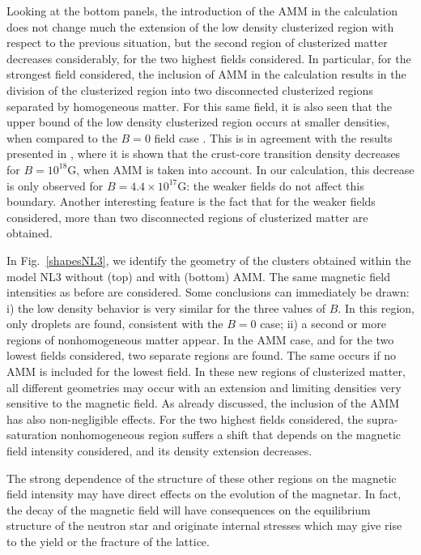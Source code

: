 \documentclass[epj]{svjour}
\begin{document}
Looking at the bottom panels, the introduction of the AMM in the calculation does
not change much the extension of the low density clusterized region with respect to the previous
situation, but the second region of clusterized matter decreases considerably, for the two highest fields considered. In particular, for the strongest field
considered, the inclusion of AMM in the calculation results in
  the division of the clusterized region into two disconnected
  clusterized regions separated by homogeneous matter.
For this same field, it is also seen that
the upper bound of the low density clusterized region occurs at smaller
densities, when compared to the $B=0$ field case \cite{Avancini-10}.
This is in agreement with the results presented in
\cite{Bao21}, where it is shown that the crust-core transition density
decreases for $B=10^{18}$G, when AMM is taken into account. In our
calculation, this decrease is only observed for  $B=4.4\times10^{17}$G:
the weaker fields do not affect this boundary. Another interesting
feature is the fact that  for  the weaker fields considered, more
  than two
disconnected regions of clusterized matter are obtained.


In Fig.~\ref{shapesNL3}, we identify the geometry of the clusters
obtained within the model NL3 without (top) and with  (bottom)
AMM. The same
magnetic field intensities as before are considered. Some conclusions can
 immediately be drawn: i) the low density behavior is very similar for the
three values of $B$. In this region, only droplets are found,
consistent with the $B=0$ case; ii)
 a second or more regions
of nonhomogeneous matter appear. In the AMM case, and for the two
lowest fields considered, two separate regions are found. The same
occurs if no AMM is included for the lowest field.
In these new regions of clusterized matter, all different geometries may
occur  with an extension and limiting densities very sensitive to
the magnetic field. As already discussed, the inclusion of the AMM has also
non-negligible 
effects. For the two highest fields considered, the supra-saturation nonhomogeneous region
suffers a shift  that depends on the magnetic field intensity
considered, and its density extension decreases. 

The strong dependence of the structure of
 these
other regions on the
magnetic field intensity may have direct effects on the
evolution of the magnetar. In fact, the decay of the magnetic field
will have consequences on the equilibrium structure of the neutron
star and originate internal stresses which may give rise to the yield or
the fracture of the  lattice.
\end{document}
